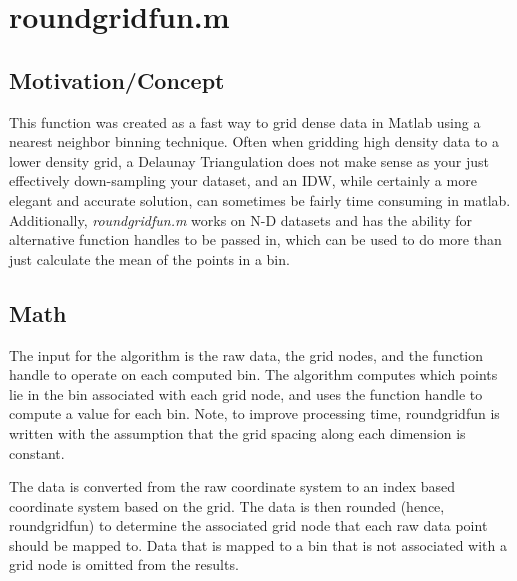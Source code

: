\documentclass{article}
\begin{document}
\section{roundgridfun.m}


\subsection{Motivation/Concept}
This function was created as a fast way to grid dense data in Matlab using a nearest neighbor binning technique.  Often when gridding high density data to a lower density grid, a Delaunay Triangulation does not make sense as your just effectively down-sampling your dataset, and an IDW, while certainly a more elegant and accurate solution, can sometimes be fairly time consuming in matlab.  Additionally, \textit{roundgridfun.m} works on N-D datasets and has the ability for alternative function handles to be passed in, which can be used to do more than just calculate the mean of the points in a bin.

\clearpage
\subsection{Math}
The input for the algorithm is the raw data, the grid nodes, and the function handle to operate on each computed bin.  The algorithm computes which points lie in the bin associated with each grid node, and uses the function handle to compute a value for each bin.  Note, to improve processing time, roundgridfun is written with the assumption that the grid spacing along each dimension is constant.

The data is converted from the raw coordinate system to an index based coordinate system based on the grid.  The data is then rounded (hence, roundgridfun) to determine the associated grid node that each raw data point should be mapped to.  Data that is mapped to a bin that is not associated with a grid node is omitted from the results.  
\end{document}

